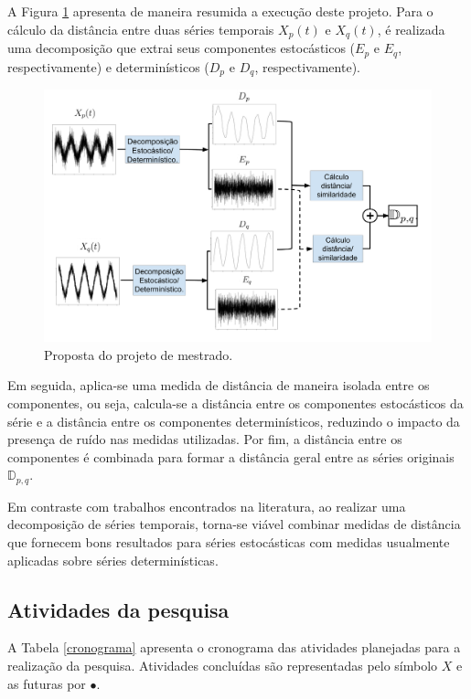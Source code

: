 
A Figura \ref{prop1} apresenta de maneira resumida a execução deste projeto. Para o cálculo da distância entre duas séries temporais $X_p(t)$ e $X_q(t)$, é realizada uma decomposição que extrai seus componentes estocásticos ($E_p$ e $E_q$, respectivamente) e determinísticos ($D_p$ e $D_q$, respectivamente).

\begin{figure}[!ht]
\begin{center}
\includegraphics[scale=0.2]{esquema.pdf}
\caption{Proposta do projeto de mestrado.}
\label{prop1}
\end{center}
\end{figure}

Em seguida, aplica-se uma medida de distância de maneira isolada entre os componentes, ou seja, calcula-se a distância entre os componentes estocásticos da série e a distância entre os componentes determinísticos, reduzindo o impacto da presença de ruído nas medidas utilizadas. Por fim, a distância entre os componentes é combinada para formar a distância geral entre as séries originais $\mathbb{D}_{p,q}$.

Em contraste com trabalhos encontrados na literatura, ao realizar uma decomposição de séries temporais, torna-se viável combinar medidas de distância que fornecem bons resultados para séries estocásticas com medidas usualmente aplicadas sobre séries determinísticas. 

\subsection{Atividades da pesquisa}

A Tabela \ref{cronograma} apresenta o cronograma das atividades planejadas para a realização da pesquisa. Atividades concluídas são representadas pelo símbolo $X$ e as futuras por $\bullet$. 



